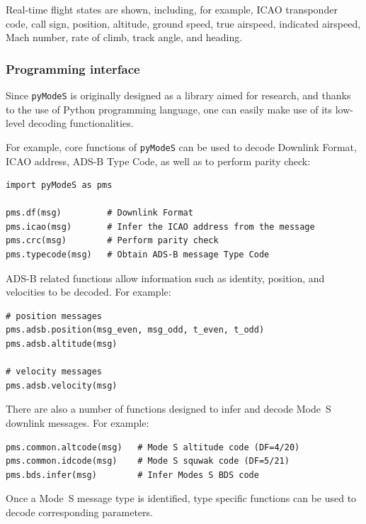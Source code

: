 Real-time flight states are shown, including, for example, ICAO transponder code, call sign, position,  altitude, ground speed, true airspeed, indicated airspeed, Mach number, rate of climb, track angle, and heading.

\subsubsection{Programming interface}

Since \texttt{pyModeS} is originally designed as a library aimed for research, and thanks to the use of Python programming language, one can easily make use of its low-level decoding functionalities.

For example, core functions of \texttt{pyModeS} can be used to decode Downlink Format, ICAO address, ADS-B Type Code, as well as to perform parity check:

\begin{verbatim}
import pyModeS as pms

pms.df(msg)         # Downlink Format
pms.icao(msg)       # Infer the ICAO address from the message
pms.crc(msg)        # Perform parity check
pms.typecode(msg)   # Obtain ADS-B message Type Code
\end{verbatim}


ADS-B related functions allow information such as identity, position, and velocities to be decoded. For example:

\begin{verbatim}
# position messages
pms.adsb.position(msg_even, msg_odd, t_even, t_odd)
pms.adsb.altitude(msg)

# velocity messages
pms.adsb.velocity(msg)
\end{verbatim}

There are also a number of functions designed to infer and decode Mode~S downlink messages. For example:

\begin{verbatim}
pms.common.altcode(msg)   # Mode S altitude code (DF=4/20)
pms.common.idcode(msg)    # Mode S squwak code (DF=5/21)
pms.bds.infer(msg)        # Infer Modes S BDS code
\end{verbatim}

Once a Mode~S message type is identified, type specific functions can be used to decode corresponding parameters.

